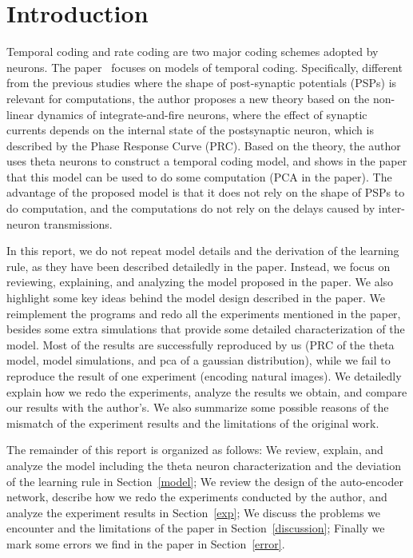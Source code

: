 \section{Introduction}
\label{intro}

Temporal coding and rate coding are two major coding schemes adopted by neurons.
The paper~\cite{voe2007temporal} focuses on models of temporal coding. Specifically,
different from the previous studies where the shape of post-synaptic potentials (PSPs) is relevant for computations,
the author proposes a new theory based on the non-linear dynamics of integrate-and-fire neurons,
where the effect of synaptic currents depends on the internal state of the postsynaptic neuron, 
which is described by the Phase Response Curve (PRC). 
Based on the theory, the author uses theta neurons to construct a temporal coding model,
and shows in the paper that this model can be used to do some computation (PCA in the paper).
The advantage of the proposed model is that it does not rely on the shape of PSPs to do computation,
and the computations do not rely on the delays caused by inter-neuron transmissions.

In this report, we do not repeat model details and the derivation of the learning rule, as they have been described
detailedly in the paper. 
Instead, we focus on reviewing, explaining, and analyzing the model proposed in the paper.
We also highlight some key ideas behind the model design described in the paper.
We reimplement the programs and redo all the experiments mentioned in the paper,
besides some extra simulations that provide some detailed characterization of the model.
Most of the results are successfully reproduced by us (PRC of the theta model, model simulations, and pca of a gaussian distribution), while we fail to reproduce the result of one experiment (encoding natural images).
We detailedly explain how we redo the experiments, analyze the results we obtain, and compare our results with
the author's.
We also summarize some possible reasons of the mismatch of the experiment results and the limitations of the original work.

The remainder of this report is organized as follows:
We review, explain, and analyze the model including the theta neuron characterization and the deviation of the learning rule in Section~\ref{model}; 
We review the design of the auto-encoder network, describe how we redo the experiments conducted by the author,
and analyze the experiment results in Section~\ref{exp};
We discuss the problems we encounter and the limitations of the paper in Section~\ref{discussion};
Finally we mark some errors we find in the paper in Section~\ref{error}.
